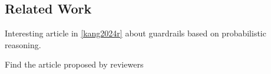 %

\subsection{Related Work}
Interesting article in \ref{kang2024r} about guardrails based on probabilistic reasoning.

Find the article proposed by reviewers
